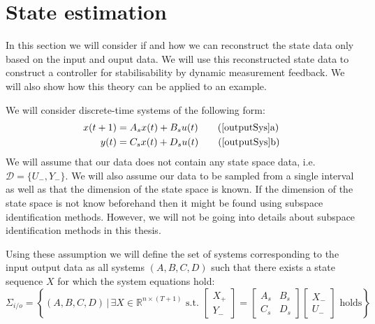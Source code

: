 \section{State estimation}
In this section we will consider if and how we can reconstruct the state data only based on the input and ouput data. We will use this reconstructed state data to construct a controller for stabilisability by dynamic measurement feedback. We will also show how this theory can be applied to an example.



We will consider discrete-time systems of the following form:
\begin{subequations}
	\begin{align} 
	x(t+1) &= A_s x(t) + B_s u(t) \tag{\ref{outputSys}a} \\
	y(t)   &= C_s x(t) + D_s u(t) \tag{\ref{outputSys}b}
	\end{align}
\end{subequations}
We will assume that our data does not contain any state space data, i.e. $\mathcal{D} = \{ U_-,Y_- \}$. We will also assume our data to be sampled from a single interval as well as that the dimension of the state space is known. If the dimension of the state space is not know beforehand then it might be found using subspace identification methods. However, we will not be going into details about subspace identification methods in this thesis.

Using these assumption we will define the set of systems corresponding to the input output data as all systems $(A,B,C,D)$ such that there exists a state sequence $X$ for which the system equations hold: %
\begin{equation*}
	\Sigma_{i/o} = \left\{ (A,B,C,D) \, | \, \exists X \in \mathbb{R}^{n \times (T+1)} \mbox{ s.t. } \begin{bmatrix} X_{+} \\ Y_{-} \end{bmatrix} = \begin{bmatrix} A_s & B_s \\ C_s & D_s \end{bmatrix} \begin{bmatrix} X_{-} \\ U_{-} \end{bmatrix} \mbox{ holds} \right\}
\end{equation*}

